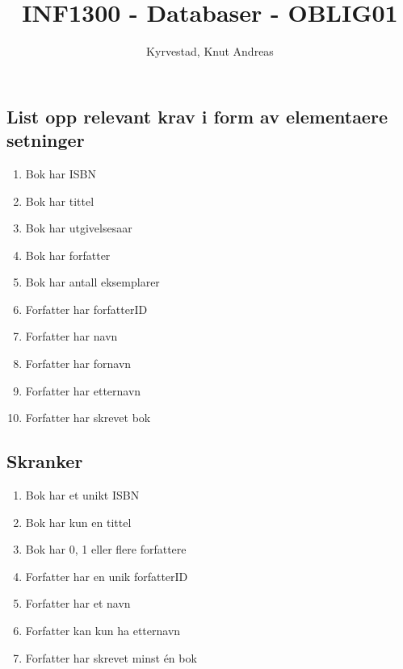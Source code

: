 \documentclass[10pt, a4paper]{report}
\author{Kyrvestad, Knut Andreas}
\title{INF1300 - Databaser - OBLIG01}
\begin{document}
\maketitle

\newpage

\subsection*{List opp relevant krav i form av elementaere setninger}

\begin{enumerate}
\item Bok har ISBN
\item Bok har tittel
\item Bok har utgivelsesaar
\item Bok har forfatter
\item Bok har antall eksemplarer
\item Forfatter har forfatterID
\item Forfatter har navn
\item Forfatter har fornavn
\item Forfatter har etternavn
\item Forfatter har skrevet bok
\end{enumerate}

\subsection*{Skranker}

\begin{enumerate}
\item Bok har et unikt ISBN
\item Bok har kun en tittel
\item Bok har 0, 1 eller flere forfattere
\item Forfatter har en unik forfatterID
\item Forfatter har et navn
\item Forfatter kan kun ha etternavn
\item Forfatter har skrevet minst én bok
\end{enumerate}
\end{document}
